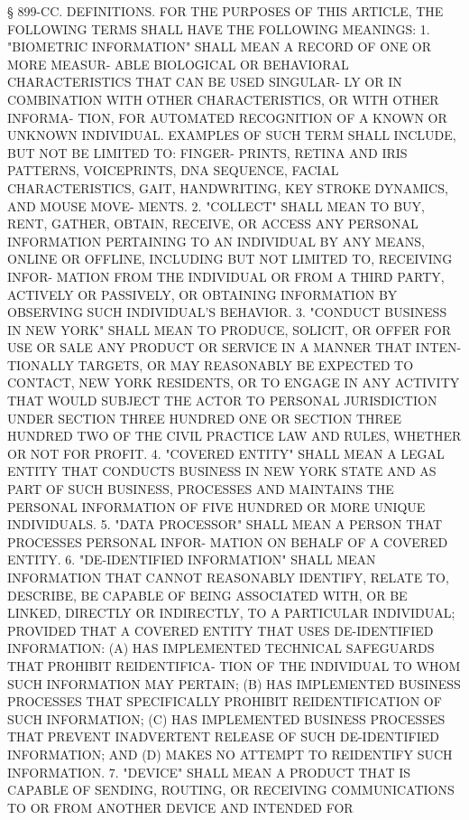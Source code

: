    § 899-CC. DEFINITIONS. FOR THE PURPOSES OF THIS ARTICLE, THE FOLLOWING
 TERMS SHALL HAVE THE FOLLOWING MEANINGS:
   1.  "BIOMETRIC INFORMATION" SHALL MEAN A RECORD OF ONE OR MORE MEASUR-
 ABLE BIOLOGICAL OR BEHAVIORAL CHARACTERISTICS THAT CAN BE USED SINGULAR-
 LY OR IN COMBINATION WITH OTHER CHARACTERISTICS, OR WITH OTHER  INFORMA-
 TION,  FOR  AUTOMATED  RECOGNITION  OF  A  KNOWN  OR UNKNOWN INDIVIDUAL.
 EXAMPLES OF SUCH TERM SHALL INCLUDE, BUT NOT BE  LIMITED  TO:    FINGER-
 PRINTS,  RETINA  AND  IRIS  PATTERNS,  VOICEPRINTS, DNA SEQUENCE, FACIAL
 CHARACTERISTICS, GAIT, HANDWRITING, KEY STROKE DYNAMICS, AND MOUSE MOVE-
 MENTS.
   2. "COLLECT" SHALL MEAN TO BUY,  RENT,  GATHER,  OBTAIN,  RECEIVE,  OR
 ACCESS  ANY  PERSONAL  INFORMATION  PERTAINING  TO  AN INDIVIDUAL BY ANY
 MEANS, ONLINE OR OFFLINE, INCLUDING BUT NOT LIMITED TO, RECEIVING INFOR-
 MATION FROM THE INDIVIDUAL OR FROM A THIRD PARTY, ACTIVELY OR PASSIVELY,
 OR OBTAINING INFORMATION BY OBSERVING SUCH INDIVIDUAL'S BEHAVIOR.
   3. "CONDUCT BUSINESS IN NEW YORK" SHALL MEAN TO PRODUCE,  SOLICIT,  OR
 OFFER  FOR  USE  OR  SALE ANY PRODUCT OR SERVICE IN A MANNER THAT INTEN-
 TIONALLY TARGETS, OR MAY REASONABLY BE EXPECTED  TO  CONTACT,  NEW  YORK
 RESIDENTS,  OR TO ENGAGE IN ANY ACTIVITY THAT WOULD SUBJECT THE ACTOR TO
 PERSONAL JURISDICTION UNDER SECTION THREE HUNDRED ONE OR  SECTION  THREE
 HUNDRED  TWO  OF  THE  CIVIL  PRACTICE LAW AND RULES, WHETHER OR NOT FOR
 PROFIT.
   4. "COVERED ENTITY" SHALL MEAN A LEGAL ENTITY THAT  CONDUCTS  BUSINESS
 IN  NEW YORK STATE AND AS PART OF SUCH BUSINESS, PROCESSES AND MAINTAINS
 THE PERSONAL INFORMATION OF FIVE HUNDRED OR MORE UNIQUE INDIVIDUALS.
   5. "DATA PROCESSOR" SHALL MEAN A PERSON THAT PROCESSES PERSONAL INFOR-
 MATION ON BEHALF OF A COVERED ENTITY.
   6. "DE-IDENTIFIED INFORMATION"  SHALL  MEAN  INFORMATION  THAT  CANNOT
 REASONABLY IDENTIFY, RELATE TO, DESCRIBE, BE CAPABLE OF BEING ASSOCIATED
 WITH,  OR BE LINKED, DIRECTLY OR INDIRECTLY, TO A PARTICULAR INDIVIDUAL;
 PROVIDED THAT A COVERED ENTITY THAT USES DE-IDENTIFIED INFORMATION:
   (A) HAS IMPLEMENTED TECHNICAL SAFEGUARDS THAT  PROHIBIT  REIDENTIFICA-
 TION OF THE INDIVIDUAL TO WHOM SUCH INFORMATION MAY PERTAIN;
   (B)  HAS  IMPLEMENTED  BUSINESS  PROCESSES  THAT SPECIFICALLY PROHIBIT
 REIDENTIFICATION OF SUCH INFORMATION;
   (C)  HAS  IMPLEMENTED  BUSINESS  PROCESSES  THAT  PREVENT  INADVERTENT
 RELEASE OF SUCH DE-IDENTIFIED INFORMATION; AND
   (D) MAKES NO ATTEMPT TO REIDENTIFY SUCH INFORMATION.
   7.  "DEVICE" SHALL MEAN A PRODUCT THAT IS CAPABLE OF SENDING, ROUTING,
 OR RECEIVING COMMUNICATIONS TO OR FROM ANOTHER DEVICE AND  INTENDED  FOR
